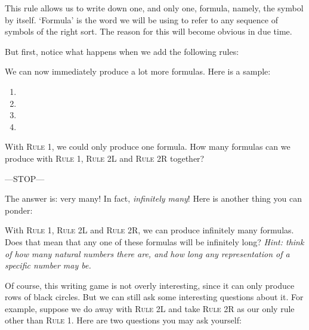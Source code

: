 This rule allows us to write down one, and only one, formula, namely, the symbol \bcirc{} by itself. `Formula' is the word we will be using to refer to any sequence of symbols of the right sort. The reason for this will become obvious in due time. 

But first, notice what happens when we add the following rules:



We can now immediately produce a lot more formulas. Here is a sample: 

\begin{enumerate}
	\item \bcirc{}\bcirc{}
	\item \bcirc{}\bcirc{}\bcirc{}\bcirc{}\bcirc{}\bcirc{}
	\item \bcirc{}\bcirc{}\bcirc{}\bcirc{}
	\item \bcirc{}\bcirc{}\bcirc{}\bcirc{}\bcirc{}\bcirc{}\bcirc{}\bcirc{}
\end{enumerate}


\begin{exc}
With \textsc{Rule 1}, we could only produce one formula. How many formulas can we produce with \textsc{Rule 1}, \textsc{Rule 2L} and \textsc{Rule 2R} together?
\end{exc}

\begin{center}
	---STOP---
\end{center}

The answer is: very many! In fact, \textit{infinitely many}! Here is another thing you can ponder:

\begin{exc}
With \textsc{Rule 1}, \textsc{Rule 2L} and \textsc{Rule 2R}, we can produce infinitely many formulas. Does that mean that any one of these formulas will be infinitely long? \textit{Hint: think of how many natural numbers there are, and how long any representation of a specific number may be. }
\end{exc}

Of course, this writing game is not overly interesting, since it can only produce rows of black circles. But we can still ask some interesting questions about it. For example, suppose we do away with \textsc{Rule 2L} and take \textsc{Rule 2R} as our only rule other than \textsc{Rule 1}. Here are two questions you may ask yourself:

